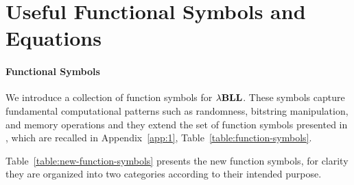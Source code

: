 \section{Useful Functional Symbols and Equations}\label{sec:useful-functional-symbols-and-equations}
\paragraph{Functional Symbols}
We introduce a collection of function symbols for ${\lambda}\mathbf{BLL}$. These symbols capture fundamental computational patterns such as randomness, bitstring manipulation, and memory operations and they extend the set of function symbols presented in \cite{lago2024-extended}, which are recalled in Appendix~\ref{app:1}, Table~\ref{table:function-symbols}.

Table~\ref{table:new-function-symbols} presents the new function symbols, for clarity they are organized into two categories according to their intended purpose.

